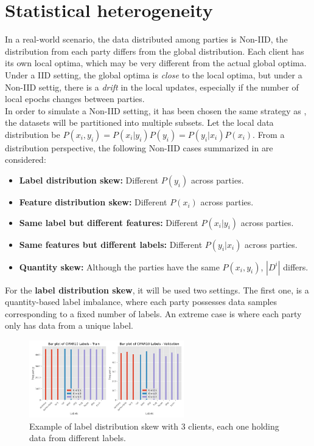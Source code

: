 \section{Statistical heterogeneity}
In a real-world scenario, the data distributed among parties is Non-IID, the distribution from each party differs from the global distribution. Each client has its own local optima, which may be very different from the actual global optima.
Under a IID setting, the global optima is \textit{close} to the local optima, but under a Non-IID settig, there is a \textit{drift} in the local updates, especially if the number of local epochs changes between parties.\\

In order to simulate a Non-IID setting, it has been chosen the same strategy as \cite{li2021}, the datasets will be partitioned into multiple subsets. Let the local data distribution be $P(x_i, y_i) = P(x_i|y_i)P(y_i) = P(y_i | x_i)P(x_i)$. From a distribution perspective, the following Non-IID cases summarized in \cite{kairouz2021} are considered:

\begin{itemize}
  \item \textbf{Label distribution skew:} Different $P(y_i)$ across parties.
  \item \textbf{Feature distribution skew:} Different $P(x_i)$ across parties.
  \item \textbf{Same label but different features:} Different $P(x_i | y_i)$ across parties.
  \item \textbf{Same features but different labels:} Different $P(y_i | x_i)$ across parties.
  \item \textbf{Quantity skew:} Although the parties have the same $P(x_i, y_i)$, $|D^i|$ differs.
\end{itemize}

For the \textbf{label distribution skew}, it will be used two settings. The first one, is a quantity-based label imbalance, where each party possesses data samples corresponding to a fixed number of labels. An extreme case is where each party only has data from a unique label.

\begin{figure}[H]
  \centering
  \includegraphics[width=0.6\textwidth]{figures/2-Federated_Learning/Example_Quantity_based_3_clients.png}
  \caption{Example of label distribution skew with 3 clients, each one holding data from different labels.}
\end{figure}



